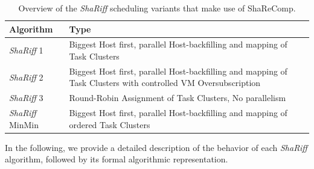 \begin{table}[H]
    \centering
    \footnotesize
    \begin{tabularx}{\textwidth}{l p{10cm}}
        \toprule
        \textbf{Algorithm}      & \textbf{Type}                                                                                                  \\
        \midrule
        \textit{ShaRiff} 1      & Biggest Host first, parallel Host-backfilling and mapping of Task Clusters                                     \\
        \textit{ShaRiff} 2      & Biggest Host first, parallel Host-backfilling and mapping of Task Clusters with controlled VM Oversubscription \\
        \textit{ShaRiff} 3      & Round-Robin Assignment of Task Clusters, No parallelism                                                        \\
        \textit{ShaRiff} MinMin & Biggest Host first, parallel Host-backfilling and mapping of ordered Task Clusters                             \\
        \bottomrule
    \end{tabularx}
    \small
    \caption{Overview of the \textit{ShaRiff} scheduling variants that make use of ShaReComp.}
    \label{tab:shariff_overview}
\end{table}


In the following, we provide a detailed description of the behavior of each \textit{ShaRiff} algorithm, followed by its formal algorithmic representation.

